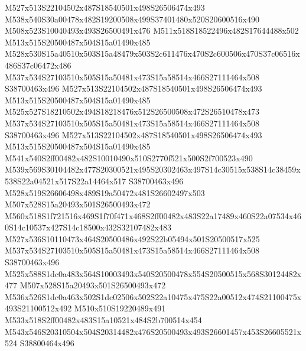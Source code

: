 \documentclass{article}
\begin{document}
\begin{multicols}{2}


M527x513S22104502x487S18540501x498S26506474x493 M538x540S30a00478x482S19200508x499S37401480x520S20600516x490 M508x523S10040493x493S26500491x476 M511x518S18522496x482S17644488x502 M513x515S20500487x504S15a01490x485 M528x530S15a40510x503S15a48479x503S2c611476x470S2c600506x470S37c06516x486S37c06472x486 M537x534S27103510x505S15a50481x473S15a58514x466S27111464x508 S38700463x496 M527x513S22104502x487S18540501x498S26506474x493 M513x515S20500487x504S15a01490x485 M525x527S18210502x494S18218476x512S26500508x472S26510478x473 M537x534S27103510x505S15a50481x473S15a58514x466S27111464x508 S38700463x496 M527x513S22104502x487S18540501x498S26506474x493 M513x515S20500487x504S15a01490x485 M541x540S2ff00482x482S10010490x510S2770f521x500S2f700523x490 M539x569S30104482x477S20300521x495S20302463x497S14c30515x538S14c38459x538S22a04521x517S22a14464x517 S38700463x496 M528x519S26606498x489S19a50472x481S26602497x503 M507x528S15a20493x501S26500493x472 M560x518S1f721516x469S1f70f471x468S2ff00482x483S22a17489x460S22a07534x460S14c10537x427S14c18500x432S32107482x483 M527x536S10110473x464S20500486x492S22b05494x501S20500517x525 M537x534S27103510x505S15a50481x473S15a58514x466S27111464x508 S38700463x496 M525x588S1dc0a483x564S10003493x540S20500478x554S20500515x568S30124482x477 M507x528S15a20493x501S26500493x472 M536x526S1dc0a463x502S1dc02506x502S22a10475x475S22a00512x474S21100475x493S21100512x492 M510x510S19220489x491 M533x518S2ff00482x483S15a10521x484S2b700514x454 M543x546S20310504x504S20314482x476S20500493x493S26601457x453S26605521x524 S38800464x496




\end{multicols}
\end{document}
